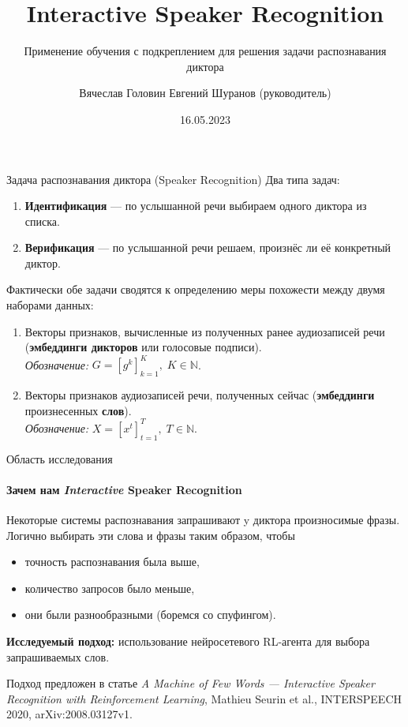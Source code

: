 \documentclass[aspectratio=43]{beamer}
\title{Interactive Speaker Recognition}
\subtitle{Применение обучения с подкреплением для решения задачи распознавания
          диктора}
\author[В.С.~Головин]{Вячеслав Головин \texorpdfstring{\newline}{, }
    {\small Евгений Шуранов (руководитель)}}
\institute[ВШЭ]{Huawei CBG AI и ФКН ВШЭ СПб}
\date{16.05.2023}
\begin{document}
\frame{\titlepage}

\begin{frame}{Задача распознавания диктора (Speaker Recognition)}
    Два типа задач:
    \begin{enumerate}
        \item \textbf{Идентификация} --- по услышанной речи выбираем одного диктора из списка.
        \item \textbf{Верификация} --- по услышанной речи решаем, произнёс ли её конкретный диктор.
    \end{enumerate}\vspace{1em}

    Фактически обе задачи сводятся к определению меры похожести между двумя
    наборами данных:
    \begin{enumerate}
        \item Векторы признаков, вычисленные из полученных ранее аудиозаписей речи
        (\textbf{эмбеддинги дикторов} или голосовые подписи).\\
        \textit{Обозначение:} $G = {[g^k]}_{k=1}^K, \; K \in \mathbb{N}$.
        \item Векторы признаков аудиозаписей речи, полученных сейчас
        (\textbf{эмбеддинги} произнесенных \textbf{слов}).\\
        \textit{Обозначение:} $X = {[x^t]}_{t=1}^T, \; T \in \mathbb{N}$.
    \end{enumerate}
\end{frame}

\begin{frame}{Область исследования}
    \framesubtitle{Зачем нам \emph{Interactive} Speaker Recognition}
    Некоторые системы распознавания запрашивают y диктора произносимые фразы.
    Логично выбирать эти слова и фразы таким образом, чтобы
    \begin{itemize}
        \item точность распознавания была выше,
        \item количество запросов было меньше,
        \item они были разнообразными (боремся со спуфингом).
    \end{itemize}\vspace{1em}

    \textbf{Исследуемый подход:} использование нейросетевого RL-агента для
    выбора запрашиваемых слов.\vspace{1em}

    Подход предложен в статье \textit{A Machine of Few Words --- Interactive
    Speaker Recognition with Reinforcement Learning}, Mathieu Seurin et al.,
    INTERSPEECH 2020, arXiv:2008.03127v1.
\end{frame}
\end{document}
